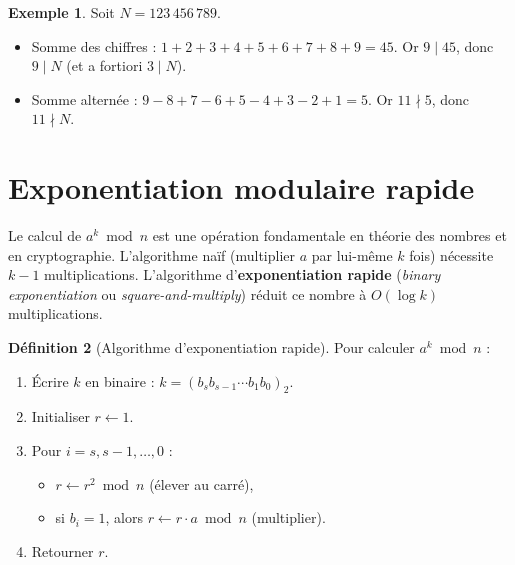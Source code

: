 \documentclass[12pt,a4paper,openany]{book}
\theoremstyle{definition}
\newtheorem{definition}{Définition}[chapter]
\newtheorem{exemple}[definition]{Exemple}
\theoremstyle{plain}
\theoremstyle{remark}
\begin{document}
\begin{exemple}
\label{ex:div-criteres}
Soit $N = 123\,456\,789$.
\begin{itemize}
  \item Somme des chiffres : $1+2+3+4+5+6+7+8+9 = 45$. Or $9 \mid 45$,
    donc $9 \mid N$ (et a fortiori $3 \mid N$).
  \item Somme alternée : $9 - 8 + 7 - 6 + 5 - 4 + 3 - 2 + 1 = 5$. Or $11 \nmid 5$,
    donc $11 \nmid N$.
\end{itemize}
\end{exemple}

\section{Exponentiation modulaire rapide}
\label{sec:cong-exp-rapide}

Le calcul de $a^k \bmod n$ est une opération fondamentale en théorie des nombres
et en cryptographie. L'algorithme naïf (multiplier $a$ par lui-même $k$ fois)
nécessite $k - 1$ multiplications. L'algorithme d'\textbf{exponentiation rapide}
(\emph{binary exponentiation} ou
\emph{square-and-multiply}) réduit ce nombre à $O(\log k)$ multiplications.

\begin{definition}[Algorithme d'exponentiation rapide]
\label{def:exp-rapide}
Pour calculer $a^k \bmod n$ :
\begin{enumerate}
  \item Écrire $k$ en binaire : $k = (b_s b_{s-1} \cdots b_1 b_0)_2$.
  \item Initialiser $r \leftarrow 1$.
  \item Pour $i = s, s-1, \ldots, 0$ :
    \begin{itemize}
      \item $r \leftarrow r^2 \bmod n$ \quad (élever au carré),
      \item si $b_i = 1$, alors $r \leftarrow r \cdot a \bmod n$ \quad (multiplier).
    \end{itemize}
  \item Retourner $r$.
\end{enumerate}
\end{definition}
\end{document}
